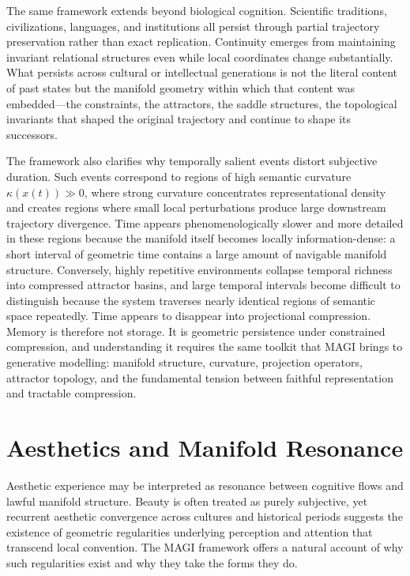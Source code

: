 \documentclass[11pt,a4paper,twocolumn]{article}
\begin{document}
The same framework extends beyond biological cognition.
Scientific traditions, civilizations, languages, and
institutions all persist through partial trajectory
preservation rather than exact replication. Continuity
emerges from maintaining invariant relational structures
even while local coordinates change substantially. What
persists across cultural or intellectual generations is
not the literal content of past states but the manifold
geometry within which that content was embedded---the
constraints, the attractors, the saddle structures, the
topological invariants that shaped the original trajectory
and continue to shape its successors.

The framework also clarifies why temporally salient events
distort subjective duration. Such events correspond to
regions of high semantic curvature $\kappa(x(t)) \gg 0$,
where strong curvature concentrates representational density
and creates regions where small local perturbations produce
large downstream trajectory divergence. Time appears
phenomenologically slower and more detailed in these regions
because the manifold itself becomes locally information-dense:
a short interval of geometric time contains a large amount
of navigable manifold structure. Conversely, highly
repetitive environments collapse temporal richness into
compressed attractor basins, and large temporal intervals
become difficult to distinguish because the system traverses
nearly identical regions of semantic space repeatedly.
Time appears to disappear into projectional compression.
Memory is therefore not storage. It is geometric persistence
under constrained compression, and understanding it requires
the same toolkit that MAGI brings to generative modelling:
manifold structure, curvature, projection operators,
attractor topology, and the fundamental tension between
faithful representation and tractable compression.


\section{Aesthetics and Manifold Resonance}

Aesthetic experience may be interpreted as resonance between
cognitive flows and lawful manifold structure. Beauty is
often treated as purely subjective, yet recurrent aesthetic
convergence across cultures and historical periods suggests
the existence of geometric regularities underlying perception
and attention that transcend local convention. The MAGI
framework offers a natural account of why such regularities
exist and why they take the forms they do.
\end{document}
